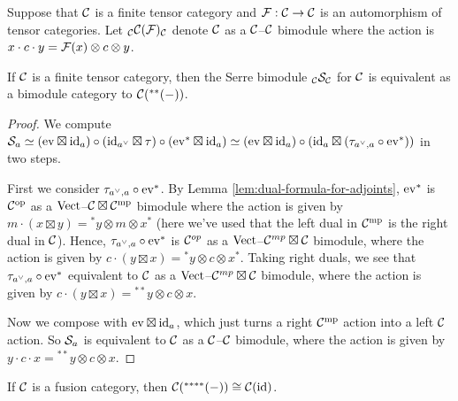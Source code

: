 \documentclass{amsart}
\begin{document}

\begin{definition}
Suppose that $\mathcal C$ is a finite tensor category and $\mathcal F: \mathcal C \rightarrow \mathcal C$ is an automorphism of tensor categories.  Let ${}_\mathcal C \mathcal C(\mathcal F)_\mathcal C$ denote $\mathcal C$ as a $\mathcal C$--$\mathcal C$ bimodule where the action is $x \cdot c \cdot y = \mathcal F(x) \otimes c \otimes y$.   
\end{definition}

\begin{theorem} \label{thm-serre}
If $\mathcal C$ is a finite tensor category, then the Serre bimodule ${}_{\mathcal C} {\mathcal S}_{\mathcal C}$ for $\mathcal C$ is equivalent as a bimodule category to $\mathcal C({}^{**}{(-)})$.
\end{theorem}

\begin{proof}
We compute $\mathcal S_a \simeq (\mathrm{ev} \boxtimes \mathrm{id}_a) \circ (\mathrm{id}_{a^{\vee}} \boxtimes \tau) \circ (\mathrm{ev}^{*} \boxtimes \mathrm{id}_a) \simeq (\mathrm{ev} \boxtimes \mathrm{id}_a) \circ (\mathrm{id}_a \boxtimes (\tau_{a^\vee,a} \circ  \mathrm{ev}^*))$ in two steps.  

First we consider $\tau_{a^\vee,a} \circ  \mathrm{ev}^*$.  By Lemma \ref{lem:dual-formula-for-adjoints}, $\mathrm{ev}^*$ is $\mathcal C^{\mathrm{op}}$ as a $\mathrm{Vect}$--${\mathcal C \boxtimes \mathcal C^{\mathrm{mp}}}$ bimodule where the action is given by $m\cdot (x \boxtimes y) = {}^*y \otimes m \otimes x^*$ (here we've used that the left dual in $\mathcal C^{\mathrm{mp}}$ is the right dual in $\mathcal C$).  Hence, $\tau_{a^\vee,a} \circ  \mathrm{ev}^*$ is $\mathcal C^{op}$ as a $\mathrm{Vect}$--$\mathcal C^{mp} \boxtimes \mathcal C$ bimodule, where the action is given by $c \cdot (y \boxtimes x) =  {}^*y \otimes c \otimes x^*$.  Taking right duals, we see that $\tau_{a^\vee,a} \circ  \mathrm{ev}^*$ equivalent to $\mathcal C$ as a $\mathrm{Vect}$--$\mathcal C^{mp} \boxtimes \mathcal C$ bimodule, where the action is given by $c \cdot (y \boxtimes x) =  {}^{**}y \otimes c \otimes x$.

Now we compose with $\mathrm{ev} \boxtimes \mathrm{id}_a$, which just turns a right $\mathcal C^{\mathrm{mp}}$ action into a left $\mathcal C$ action.  So $\mathcal S_a$ is equivalent to $\mathcal C$ as a  $\mathcal C$--$\mathcal C$ bimodule, where the action is given by $y \cdot c \cdot x=  {}^{**}y \otimes c \otimes x$.
\end{proof}

\begin{corollary}
If $\mathcal C$ is a fusion category, then $\mathcal C({}^{****}(-)) \cong \mathcal C(\mathrm{id})$.
\end{corollary}
\end{document}
